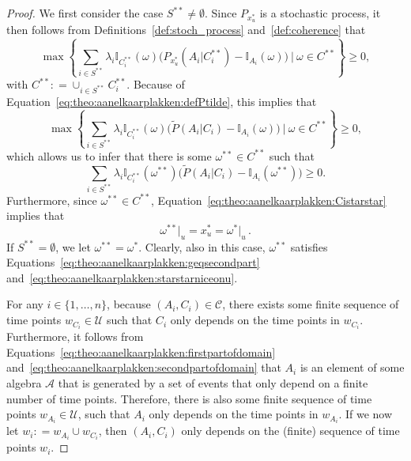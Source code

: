 \documentclass[10pt,a4paper]{paper}
\theoremstyle{definition}
\newcommand{\ind}[1]{\mathbb{I}_{#1}}
\newcommand{\coloneqq}{:\!=}
\begin{document}
\begin{proof}
We first consider the case $S^{**}\neq\emptyset$. Since $P_{x_u^*}$ is a stochastic process, it then follows from Definitions~\ref{def:stoch_process} and~\ref{def:coherence} that
\begin{equation*}%
\max\left\{\sum_{i\in S^{**}}\lambda_i\ind{C_i^{**}}(\omega)\bigl(P_{x_u^*}(A_i\vert C_i^{**})-\ind{A_i}(\omega)\bigr)~\Bigg\vert~\omega\in C^{**}\right\}\geq0,
\end{equation*}
with $C^{**}\coloneqq\cup_{i\in S^{**}}C_i^{**}$. Because of Equation~\eqref{eq:theo:aanelkaarplakken:defPtilde}, this implies that
\begin{equation*}%
\max\left\{\sum_{i\in S^{**}}\lambda_i\ind{C_i^{**}}(\omega)\bigl(\tilde{P}(A_i\vert C_i)-\ind{A_i}(\omega)\bigr)~\Bigg\vert~\omega\in C^{**}\right\}\geq0,
\end{equation*}
which allows us to infer that there is some $\omega^{**}\in C^{**}$ such that
\begin{equation}\label{eq:theo:aanelkaarplakken:geqsecondpart}
\sum_{i\in S^{**}}\lambda_i\ind{C_i^{**}}(\omega^{**})\bigl(\tilde{P}(A_i\vert C_i)-\ind{A_i}(\omega^{**})\bigr)\geq0.
\end{equation}
Furthermore, since $\omega^{**}\in C^{**}$, Equation~\eqref{eq:theo:aanelkaarplakken:Cistarstar} implies that
\begin{equation}\label{eq:theo:aanelkaarplakken:starstarniceonu}
\omega^{**}\vert_u=x_u^* = \omega^{*}\vert_u\,.
\end{equation}
If $S^{**}=\emptyset$, we let $\omega^{**}=\omega^{*}$. Clearly, also in this case, $\omega^{**}$ satisfies Equations~\eqref{eq:theo:aanelkaarplakken:geqsecondpart} and~\eqref{eq:theo:aanelkaarplakken:starstarniceonu}.

For any $i\in\{1,\ldots,n\}$, because $(A_i,C_i)\in\mathcal{C}$, there exists some finite sequence of time points $w_{C_i}\in\mathcal{U}$ such that $C_i$ only depends on the time points in $w_{C_i}$. Furthermore, it follows from Equations~\eqref{eq:theo:aanelkaarplakken:firstpartofdomain} and~\eqref{eq:theo:aanelkaarplakken:secondpartofdomain} that $A_i$ is an element of some algebra $\mathcal{A}$ that is generated by a set of events that only depend on a finite number of time points. Therefore, there is also some finite sequence of time points $w_{A_i}\in\mathcal{U}$, such that $A_i$ only depends on the time points in $w_{A_i}$. If we now let $w_i\coloneqq w_{A_i}\cup w_{C_i}$, then $(A_i,C_i)$ only depends on the (finite) sequence of time points $w_i$.


\end{proof}
\end{document}
